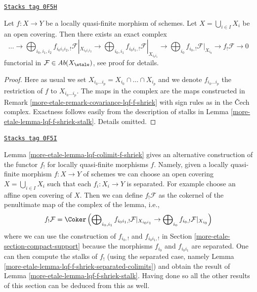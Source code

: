 \begin{lemma}
\label{more-etale-lemma-lqf-colimit-f-shriek}
\href{https://stacks.math.columbia.edu/tag/0F5H}{\texttt{Stacks tag 0F5H}}

Let $f : X \to Y$ be a locally quasi-finite morphism of schemes.
Let $X = \bigcup_{i \in I} X_i$ be an open covering. Then there
exists an exact complex
$$
\ldots \to
\bigoplus\nolimits_{i_0, i_1, i_2} f_{i_0i_1i_2, !}
\mathcal{F}|_{X_{i_0i_1i_2}} \to
\bigoplus\nolimits_{i_0, i_1} f_{i_0i_1, !} \mathcal{F}|_{X_{i_0i_1}} \to
\bigoplus\nolimits_{i_0} f_{i_0, !} \mathcal{F}|_{X_{i_0}}
\to f_!\mathcal{F} \to 0
$$
functorial in $\mathcal{F} \in \textit{Ab}(X_\etale)$, see
proof for details.
\end{lemma}

\begin{proof}
Here as usual we set $X_{i_0 \ldots i_p} = X_{i_0} \cap \ldots \cap X_{i_p}$
and we denote $f_{i_0 \ldots i_p}$ the restriction of $f$ to
$X_{i_0 \ldots i_p}$. The maps in the complex are the maps
constructed in Remark \ref{more-etale-remark-covariance-lqf-f-shriek}
with sign rules as in the {\v C}ech complex.
Exactness follows easily from the description of stalks in
Lemma \ref{more-etale-lemma-lqf-f-shriek-stalk}. Details omitted.
\end{proof}

\begin{remark}

\label{more-etale-remark-alternative-lqf-f-shriek}
\href{https://stacks.math.columbia.edu/tag/0F5I}{\texttt{Stacks tag 0F5I}}

Lemma \ref{more-etale-lemma-lqf-colimit-f-shriek}
gives an alternative construction of the functor $f_!$
for locally quasi-finite morphisms $f$.
Namely, given a locally quasi-finite morphism $f : X \to Y$ of schemes
we can choose an open covering $X = \bigcup_{i \in I} X_i$
such that each $f_i : X_i \to Y$ is separated. For example choose
an affine open covering of $X$. Then we
can define $f_!\mathcal{F}$ as the cokernel of the penultimate map
of the complex of the lemma, i.e.,
$$
f_!\mathcal{F} = \Coker\left(
\bigoplus\nolimits_{i_0, i_1} f_{i_0i_1, !} \mathcal{F}|_{X_{i_0i_1}} \to
\bigoplus\nolimits_{i_0} f_{i_0, !} \mathcal{F}|_{X_{i_0}}
\right)
$$
where we can use the construction of $f_{i_0, !}$ and
$f_{i_0i_1, !}$ in Section \ref{more-etale-section-compact-support}
because the morphisms $f_{i_0}$ and $f_{i_0 i_1}$ are separated.
One can then compute the stalks of $f_!$ (using the separated
case, namely Lemma \ref{more-etale-lemma-lqf-f-shriek-separated-colimits})
and obtain the result of Lemma \ref{more-etale-lemma-lqf-f-shriek-stalk}.
Having done so all the other results of this section can be
deduced from this as well.
\end{remark}

